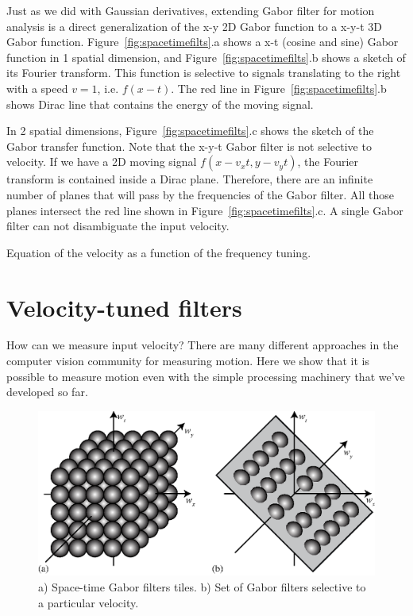 Just as we did with Gaussian derivatives, extending Gabor filter for motion analysis is a direct generalization of the x-y 2D Gabor function to a x-y-t 3D Gabor function. Figure~\ref{fig:spacetimefilts}.a shows a x-t (cosine and sine) Gabor function in 1 spatial dimension, and  Figure~\ref{fig:spacetimefilts}.b shows a sketch of its Fourier transform. This function is selective to signals translating to the right with a speed $v=1$, i.e. $f(x-t)$. The red line in Figure~\ref{fig:spacetimefilts}.b shows Dirac line that contains the energy of the moving signal. 

In 2 spatial dimensions, Figure~\ref{fig:spacetimefilts}.c shows the sketch of the Gabor transfer function. Note that the x-y-t Gabor filter is not selective to velocity. If we have a 2D moving signal $f(x-v_xt, y-v_yt)$, the Fourier transform is contained inside a Dirac plane. Therefore, there are an infinite number of planes that will pass by the frequencies of the Gabor filter. All those planes intersect the red line shown in Figure~\ref{fig:spacetimefilts}.c. A single Gabor filter can not disambiguate the input velocity. 

Equation of the velocity as a function of the frequency tuning.


\section{Velocity-tuned filters}
\label{sect:velocityTunedFilters}

How can we measure input velocity? There are many different approaches in the computer vision community
for measuring motion.  Here we show that it is possible
to measure motion even with the simple processing machinery that
we've developed so far.

\begin{figure}
\centerline{
\includegraphics[width=1\linewidth]{figures/temporal_filters/gabor_spacetime_tiles.eps}
}
\caption{a) Space-time Gabor filters tiles. b) Set of Gabor filters selective to a particular velocity.}
\label{fig:spacetimetiles}
\end{figure}



